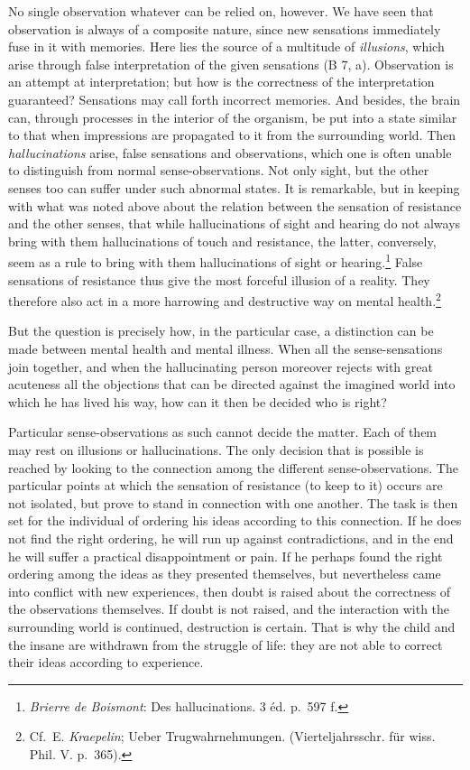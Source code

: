 \documentclass[12pt,a4paper]{book}
\newcommand{\opage}[1]{\marginnote{\footnotesize\textit{[#1]}}}
\begin{document}
No single observation whatever can be relied on, however. We have seen
that observation is always of a composite nature, since new sensations
immediately fuse in it with memories. Here lies the source of a
multitude of \emph{illusions}, which arise through false interpretation
of the given sensations (B 7, a). Observation is an attempt at
interpretation; but how is the correctness of the interpretation
guaranteed? Sensations may call forth incorrect memories. And besides,
the brain can, through processes in the interior of the organism, be put
into a
\opage{253}state similar to that when impressions are propagated to it
from the surrounding world. Then \emph{hallucinations} arise, false
sensations and observations, which one is often unable to distinguish
from normal sense-observations. Not only sight, but the other senses too
can suffer under such abnormal states. It is remarkable, but in keeping
with what was noted above about the relation between the sensation of
resistance and the other senses, that while hallucinations of sight and
hearing do not always bring with them hallucinations of touch and
resistance, the latter, conversely, seem as a rule to bring with them
hallucinations of sight or
hearing.\footnote{\emph{Brierre de Boismont}: Des hallucinations. 3 éd.
p.~597 f.} False sensations of resistance thus give the most forceful
illusion of a reality. They therefore also act in a more harrowing and
destructive way on mental health.\footnote{Cf.\ E. \emph{Kraepelin};
Ueber Trugwahrnehmungen. (Vierteljahrsschr. für wiss. Phil. V.
p.~365).}

But the question is precisely how, in the particular case, a distinction
can be made between mental health and mental illness. When all the
sense-sensations join together, and when the hallucinating person
moreover rejects with great acuteness all the objections that can be
directed against the imagined world into which he has lived his way,
how can it then be decided who is right?

Particular sense-observations as such cannot decide the matter. Each of
them may rest on illusions or hallucinations. The only decision that is
possible is reached by looking to the connection among the different
sense-observations. The particular points at which the sensation of
resistance (to keep to it) occurs are not isolated, but prove to stand in
connection with one another. The task is then set for the individual of
ordering his ideas according to this connection. If he does not find the
right ordering, he will run up against contradictions, and in the end he
will suffer a practical disappointment or pain. If he perhaps found the
right ordering among the ideas as they presented themselves, but
nevertheless came into conflict with new experiences, then doubt is
raised about the correctness of the observations themselves. If doubt is
not raised, and the interaction
\opage{254}with the surrounding world is continued, destruction is
certain. That is why the child and the insane are withdrawn from the
struggle of life: they are not able to correct their ideas according to
experience.
\end{document}
